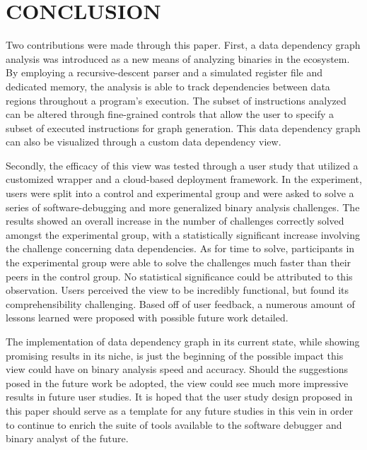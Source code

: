 \chapter{CONCLUSION}
Two contributions were made through this paper. First, a data dependency graph analysis was introduced as a new means of analyzing binaries in the  ecosystem. By employing a recursive-descent parser and a simulated register file and dedicated memory, the analysis is able to track dependencies between data regions throughout a program's execution. The subset of instructions analyzed can be altered through fine-grained controls that allow the user to specify a subset of executed instructions for graph generation. This data dependency graph can also be visualized through a custom  data dependency view.

Secondly, the efficacy of this view was tested through a user study that utilized a customized  wrapper and a cloud-based deployment framework. In the experiment, users were split into a control and experimental group and were asked to solve a series of software-debugging and more generalized binary analysis challenges. The results showed an overall increase in the number of challenges correctly solved amongst the experimental group, with a statistically significant increase involving the challenge concerning data dependencies. As for time to solve, participants in the experimental group were able to solve the challenges much faster than their peers in the control group. No statistical significance could be attributed to this observation. Users perceived the view to be incredibly functional, but found its comprehensibility challenging. Based off of user feedback, a numerous amount of lessons learned were proposed with possible future work detailed.

The implementation of data dependency graph in its current state, while showing promising results in its niche, is just the beginning of the possible impact this view could have on binary analysis speed and accuracy. Should the suggestions posed in the future work be adopted, the view could see much more impressive results in future user studies. It is hoped that the user study design proposed in this paper should serve as a template for any future studies in this vein in order to continue to enrich the suite of tools available to the software debugger and binary analyst of the future.